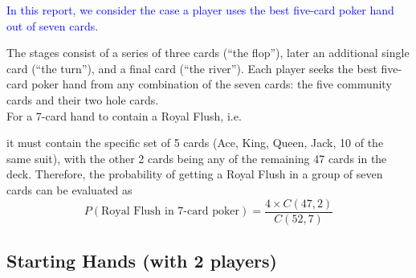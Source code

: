 \documentclass{article}
\begin{document}
\begin{center}
    \textcolor{blue}{
        In this report, we consider the case a player uses the best 
        five-card poker hand out of seven cards.
    }
\end{center}
The stages consist of a series of three cards (``the flop''), later an 
additional single card (``the turn''), and a final card (``the river''). 
Each player seeks the best five-card poker hand from any combination of 
the seven cards: the five community cards and their two hole cards.
\vspace*{5mm}\\
For a 7-card hand to contain a Royal Flush, i.e.
\begin{center}
\end{center}
it must contain the specific set of 5 cards 
(Ace, King, Queen, Jack, 10 of the same suit), 
with the other 2 cards being any of the remaining 47 cards in the deck. 
Therefore, the probability of getting a Royal Flush in a group of seven 
cards can be evaluated as 
\[
P(\text{Royal Flush in 7-card poker}) = \frac{4 \times C(47, 2)}{C(52, 7)}
\]

\newpage

\subsection*{Starting Hands (with 2 players)}
\end{document}

